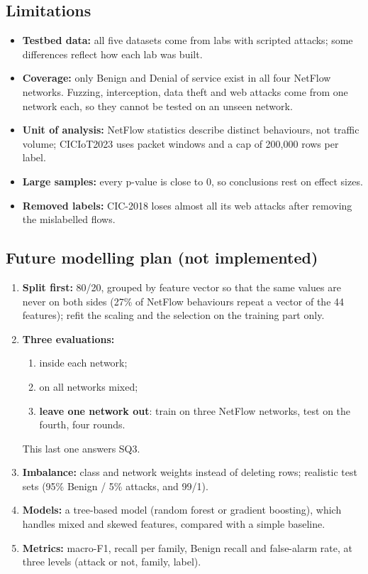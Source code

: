 \documentclass[12pt,a4paper]{article}
\begin{document}
\subsection{Limitations}
\begin{itemize}
  \item \textbf{Testbed data:} all five datasets come from labs with scripted attacks; some differences reflect how
        each lab was built.
  \item \textbf{Coverage:} only Benign and Denial of service exist in all four NetFlow networks. Fuzzing, interception,
        data theft and web attacks come from one network each, so they cannot be tested on an unseen network.
  \item \textbf{Unit of analysis:} NetFlow statistics describe distinct behaviours, not traffic volume; CICIoT2023 uses
        packet windows and a cap of 200,000 rows per label.
  \item \textbf{Large samples:} every p-value is close to 0, so conclusions rest on effect sizes.
  \item \textbf{Removed labels:} CIC-2018 loses almost all its web attacks after removing the mislabelled flows.
\end{itemize}

\subsection{Future modelling plan (not implemented)}
\begin{enumerate}
  \item \textbf{Split first:} 80/20, grouped by feature vector so that the same values are never on both sides
        (27\% of NetFlow behaviours repeat a vector of the 44 features); refit the scaling and the selection on the
        training part only.
  \item \textbf{Three evaluations:}
        \begin{enumerate}
          \item inside each network;
          \item on all networks mixed;
          \item \textbf{leave one network out}: train on three NetFlow networks, test on the fourth, four rounds.
        \end{enumerate}
        This last one answers SQ3.
  \item \textbf{Imbalance:} class and network weights instead of deleting rows; realistic test sets (95\% Benign /
        5\% attacks, and 99/1).
  \item \textbf{Models:} a tree-based model (random forest or gradient boosting), which handles mixed and skewed
        features, compared with a simple baseline.
  \item \textbf{Metrics:} macro-F1, recall per family, Benign recall and false-alarm rate, at three levels (attack or
        not, family, label).
\end{enumerate}
\end{document}
